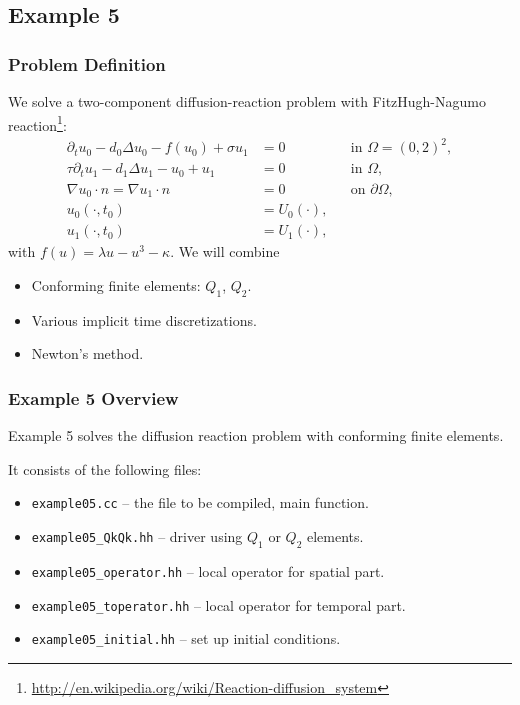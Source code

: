 \subsection{Example 5}

\begin{frame}
\frametitle{Problem Definition}
We solve a two-component diffusion-reaction problem with FitzHugh-Nagumo
reaction\footnote{\url{http://en.wikipedia.org/wiki/Reaction-diffusion_system}}:
\begin{subequations}
\begin{align*}
\partial_t u_0 - d_0 \Delta u_0 - f(u_0) + \sigma u_1 &= 0 &&\text{in $\Omega=(0,2)^2$},\\
\tau\partial_t u_1 - d_1 \Delta u_1 - u_0 + u_1 &= 0 &&\text{in $\Omega$},\\
\nabla u_0 \cdot n = \nabla u_1 \cdot n &= 0 &&\text{on $\partial\Omega$},\\
u_0(\cdot,t_0) &= U_0(\cdot), \\
u_1(\cdot,t_0) &= U_1(\cdot),
\end{align*}
\end{subequations}
with $f(u) = \lambda u - u^3 - \kappa$.
We will combine
\begin{itemize}
\item Conforming finite elements: $Q_1$, $Q_2$.
\item Various implicit time discretizations.
\item Newton's method.
\end{itemize}
\end{frame}

\begin{frame}
\frametitle{Example 5 Overview}
Example 5 solves the diffusion reaction problem with conforming finite elements.

It consists of the following files:
\begin{itemize}
\item \lstinline{example05.cc} -- the file to be compiled, main function.
\item \lstinline{example05_QkQk.hh} -- driver using $Q_1$ or $Q_2$ elements.
\item \lstinline{example05_operator.hh} -- local operator for spatial part.
\item \lstinline{example05_toperator.hh} -- local operator for temporal part.
\item \lstinline{example05_initial.hh} -- set up initial conditions.
\end{itemize}
\end{frame}

